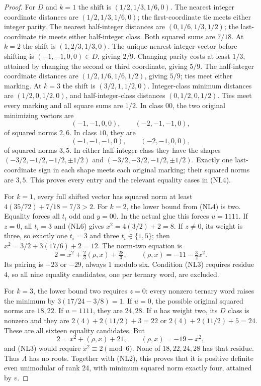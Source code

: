 \begin{proof}
For $D$ and $k=1$ the shift is $(1/2,1/3,1/6,0)$.
The nearest integer coordinate distances are
$(1/2,1/3,1/6,0)$; the first-coordinate tie meets either integer
parity. The nearest half-integer distances are
$(0,1/6,1/3,1/2)$; the last-coordinate tie meets either
half-integer class. Both squared sums are $7/18$.
At $k=2$ the shift is $(1,2/3,1/3,0)$.
The unique nearest integer vector before shifting is
$(-1,-1,0,0)\in D$, giving $2/9$.
Changing parity costs at least $1/3$, attained by changing the
second or third coordinate, giving $5/9$.
The half-integer coordinate distances are
$(1/2,1/6,1/6,1/2)$, giving $5/9$; ties meet either marking.
At $k=3$ the shift is $(3/2,1,1/2,0)$.
Integer-class minimum distances are $(1/2,0,1/2,0)$,
and half-integer-class distances $(0,1/2,0,1/2)$.
Ties meet every marking and all square sums are $1/2$.
In class $00$, the two original minimizing vectors are
\[
 (-1,-1,0,0),\qquad(-2,-1,-1,0),
\]
of squared norms $2,6$. In class $10$, they are
\[
 (-1,-1,-1,0),\qquad(-2,-1,0,0),
\]
of squared norms $3,5$.
In either half-integer class they have the shapes
$(-3/2,-1/2,-1/2,\pm1/2)$ and
$(-3/2,-3/2,-1/2,\pm1/2)$.
Exactly one last-coordinate sign in each shape meets each
original marking; their squared norms are $3,5$.
This proves every entry and the relevant equality cases in (NL4).

For $k=1$, every full shifted vector has squared norm at least
$4(35/72)+7/18=7/3>2$.
For $k=2$, the lower bound from (NL4) is two.
Equality forces all $t_i$ odd and $y=00$.
In the actual glue this forces $u=1111$.
If $z=0$, all $t_i=3$ and (NL6) gives
$x^2=4(3/2)+2=8$.
If $z\ne0$, its weight is three, so exactly one $t_i=3$
and three $t_i\in\{1,5\}$; then
$x^2=3/2+3(17/6)+2=12$.
The norm-two equation is
\[
 2=x^2+\tfrac23(\rho,x)+\tfrac{28}{3},
 \qquad(\rho,x)=-11-\tfrac32x^2.
\]
Its pairing is $-23$ or $-29$, always $1$ modulo six.
Condition (NL3) requires residue $4$, so all nine equality
candidates, one per ternary word, are excluded.

For $k=3$, the lower bound two requires $z=0$:
every nonzero ternary word raises the minimum by
$3(17/24-3/8)=1$.
If $u=0$, the possible original squared norms are $18,22$.
If $u=1111$, they are $24,28$.
If $u$ has weight two, its $D$ class is nonzero and they are
$2(4)+2(11/2)+3=22$ or $2(4)+2(11/2)+5=24$.
These are all sixteen equality candidates.
But
\[
 2=x^2+(\rho,x)+21,\qquad(\rho,x)=-19-x^2,
\]
and (NL3) would require $x^2\equiv2\pmod6$.
None of $18,22,24,28$ has that residue.
Thus $\Lambda$ has no roots. Together with (NL2), this proves
that it is positive definite even unimodular of rank 24,
with minimum squared norm exactly four, attained by $v$.
\end{proof}

